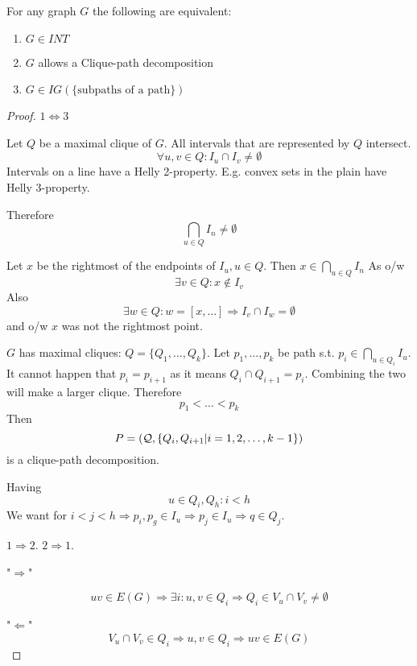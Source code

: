 \begin{theorem}
	For any graph $G$ the following are equivalent:
	\begin{enumerate}
		\item $G \in INT$
		\item $G$ allows a Clique-path decomposition
		\item $G \in IG(\{\text{subpaths of a path}\})$
	\end{enumerate}
\end{theorem}
\begin{proof}
	$1 \iff 3$

	Let $Q$ be a maximal clique of $G$.
	All intervals that are represented by $Q$ intersect.
	\[ \forall u,v \in Q: I_u \cap I_v \ne \emptyset \]
	Intervals on a line have a Helly 2-property.
	E.g. convex sets in the plain have Helly 3-property.

	Therefore
	\[ \bigcap_{u \in Q} I_n \ne \emptyset \]

	Let $x$ be the rightmost of the endpoints of $I_u, u \in Q$.
	Then $x \in \bigcap_{u \in Q} I_n$
	As o/w
	\[ \exists v \in Q: x \notin I_v \]
	Also
	\[ \exists w \in Q: w = [x, \ldots] \Rightarrow I_v \cap I_w = \emptyset \]
	and o/w $x$ was not the rightmost point.

	$G$ has maximal cliques: $Q = \{ Q_1, \ldots, Q_k \}$.
	Let $p_1, \ldots, p_k$ be path s.t. $p_i \in \bigcap_{u \in Q_i} I_u$.
	It cannot happen that $p_i = p_{i + 1}$ as it means $Q_i \cap Q_{i + 1} = p_i$.
	Combining the two will make a larger clique.
	Therefore
	\[ p_1 < \ldots < p_k \]
	Then
	\[ P = (\operatorname{\mathcal{Q}}, \{ Q_i, Q_{i + 1} | i = 1, 2, \ldots, k - 1 \}) \]
	is a clique-path decomposition.

	Having
	\[ u \in Q_i, Q_h: i < h \]
	We want for $i < j < h \Rightarrow p_i, p_g \in I_u \Rightarrow p_j \in I_u \Rightarrow q \in Q_j$.

	$1 \Rightarrow 2$.
	$2 \Rightarrow 1$.

	"$\Rightarrow$"

	\[ uv \in E(G) \Rightarrow \exists i: u,v \in Q_i \Rightarrow Q_i \in V_u \cap V_v \ne \emptyset \]

	"$\Leftarrow$"
	\[ V_u \cap V_v \in Q_i \Rightarrow u,v \in Q_i \Rightarrow  uv \in E(G) \]

\end{proof}

